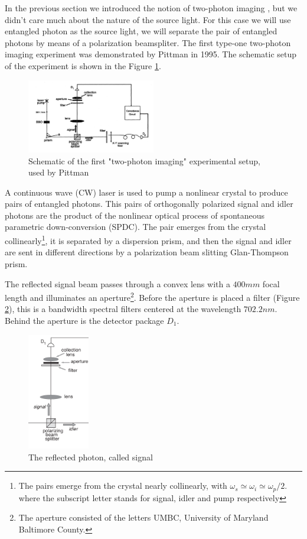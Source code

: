 In the previous section we introduced the notion of two-photon imaging , but we didn't care much about the nature of the source light. For this case we will use entangled photon as the source light, we will separate the pair of entangled photons by means of a polarization beamspliter. The first type-one two-photon imaging experiment was demonstrated by Pittman in 1995\cite{pittman}. The schematic setup of the experiment is shown in the Figure \ref{fig:pittman}. \\ 

\begin{figure}[h]
\centering
\includegraphics[width=0.5\textwidth]{Figures/pittman.png}
\caption{Schematic of the first "two-photon imaging" experimental setup, used by Pittman\cite{pittman}} 
\label{fig:pittman}
\end{figure}
A continuous wave (CW) laser is used to pump a nonlinear 
crystal to produce pairs of entangled photons. This pairs of orthogonally polarized signal and idler photons are the product
of the nonlinear optical process of spontaneous parametric down-conversion (SPDC).
The pair emerges from the crystal collinearly\footnote{The pairs emerge from the crystal nearly 
collinearly, with $\omega_s \simeq \omega_i \simeq \omega_p / 2$. where the subscript
letter stands for signal, idler and pump respectively}, it is separated by a dispersion prism, 
and then the signal and idler are sent in different directions by a polarization
beam slitting Glan-Thompson prism. 

The reflected signal beam passes through a 
convex lens with a $400mm$ focal length and illuminates an aperture\footnote{The aperture 
consisted of the letters UMBC, University of Maryland Baltimore County.}.
Before the aperture is placed a filter (Figure \ref{fig:signal}), 
this is a bandwidth spectral filters centered at the
wavelength $702.2 nm$. 
Behind the aperture is the detector package $D_1$. \\
\begin{figure}[H]
\centering
\includegraphics[width=0.24\textwidth]{Figures/signal.png}
\caption{The reflected photon, called signal} 
\label{fig:signal}
\end{figure}


